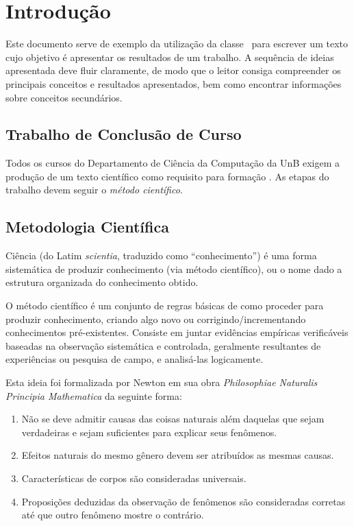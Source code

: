 \chapter{Introdução}%
Este documento serve de exemplo da utilização da classe \unbcic\ para escrever 
um texto cujo objetivo é apresentar os resultados de um trabalho. A sequência de 
ideias apresentada deve fluir claramente, de modo que o leitor consiga compreender 
os principais conceitos e resultados apresentados, bem como encontrar informações 
sobre conceitos secundários.


\section{Trabalho de Conclusão de Curso}%
Todos os cursos do Departamento de Ciência da Computação da UnB exigem a produção de um
texto científico como requisito para formação %
. 
As etapas do trabalho devem seguir o \emph{método científico}.

\section{Metodologia Científica}%
Ciência (do Latim \emph{scientia}, traduzido como ``conhecimento'') é uma forma 
sistemática de produzir conhecimento (via método científico), ou o nome dado a 
estrutura organizada do conhecimento obtido.

O método científico é um conjunto de regras básicas de como proceder para produzir 
conhecimento, criando algo novo ou corrigindo/incrementando conhecimentos 
pré-existentes. Consiste em juntar evidências empíricas verificáveis baseadas na 
observação sistemática e controlada, geralmente resultantes de experiências ou 
pesquisa de campo, e analisá-las logicamente. 

Esta ideia foi formalizada por Newton em sua obra \emph{Philosophiae Naturalis 
Principia Mathematica} \cite{newton1833philosophiae} da seguinte forma:
\begin{enumerate}
	\item Não se deve admitir causas das coisas naturais além daquelas 
	que sejam verdadeiras e sejam suficientes para explicar seus fenômenos.
	\item Efeitos naturais do mesmo gênero devem ser atribuídos as mesmas causas.
	\item Características de corpos são consideradas universais.
	\item Proposições deduzidas da observação de fenômenos são 
	consideradas corretas até que outro fenômeno mostre o contrário.
\end{enumerate}%

